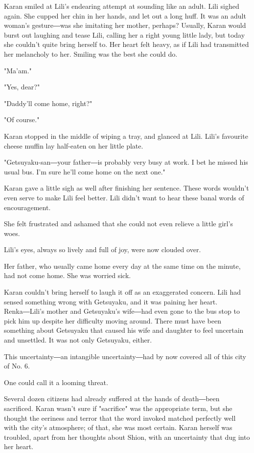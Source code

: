 Karan smiled at Lili's endearing attempt at sounding like an adult. Lili
sighed again. She cupped her chin in her hands, and let out a long huff.
It was an adult woman's gesture―was she imitating her mother, perhaps?
Usually, Karan would burst out laughing and tease Lili, calling her a
right young little lady, but today she couldn't quite bring herself to.
Her heart felt heavy, as if Lili had transmitted her melancholy to her.
Smiling was the best she could do.

"Ma'am."

"Yes, dear?"

"Daddy'll come home, right?"

"Of course."

Karan stopped in the middle of wiping a tray, and glanced at Lili.
Lili's favourite cheese muffin lay half-eaten on her little plate.

"Getsuyaku-san―your father―is probably very busy at work. I bet he
missed his usual bus. I'm sure he'll come home on the next one."

Karan gave a little sigh as well after finishing her sentence. These
words wouldn't even serve to make Lili feel better. Lili didn't want to
hear these banal words of encouragement.

She felt frustrated and ashamed that she could not even relieve a little
girl's woes.

Lili's eyes, always so lively and full of joy, were now clouded over.

Her father, who usually came home every day at the same time on the
minute, had not come home. She was worried sick.

Karan couldn't bring herself to laugh it off as an exaggerated concern.
Lili had sensed something wrong with Getsuyaku, and it was paining her
heart. Renka―Lili's mother and Getsuyaku's wife―had even gone to the bus
stop to pick him up despite her difficulty moving around. There must
have been something about Getsuyaku that caused his wife and daughter to
feel uncertain and unsettled. It was not only Getsuyaku, either.

This uncertainty―an intangible uncertainty―had by now covered all of
this city of No. 6.

One could call it a looming threat.

Several dozen citizens had already suffered at the hands of death―been
sacrificed. Karan wasn't sure if "sacrifice" was the appropriate term,
but she thought the eeriness and terror that the word invoked matched
perfectly well with the city's atmosphere; of that, she was most
certain. Karan herself was troubled, apart from her thoughts about
Shion, with an uncertainty that dug into her heart.

